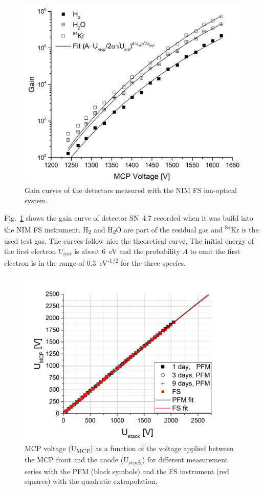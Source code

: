 	\begin{figure}[H] %
		\centering
		\includegraphics[width=.7\textwidth]{Experiments/GainDetFSLabEl.png}
		\caption{Gain curves of the detectors measured with the NIM FS ion-optical system.}
		\label{fig:MCPGainCurve4p7}
	\end{figure}
	Fig.~\ref{fig:MCPGainCurve4p7} shows the gain curve of detector SN~4.7 recorded when it was build into the NIM FS instrument. H\textsubscript{2} and H\textsubscript{2}O are part of the residual gas and \textsuperscript{84}Kr is the used test gas. The curves follow nice the theoretical curve. The initial energy of the first electron $U_{init}$ is about 6~eV and the probability $A$ to emit the first electron is in the range of 0.3~eV\textsuperscript{-1/2} for the three species.\\
	\begin{figure}[h!] %
		\centering
		\includegraphics[width=.8\textwidth]{Experiments/PFM_UstackUmccp_TimeEvol.png}
		\caption{MCP voltage (U\textsubscript{MCP}) as a function of the voltage applied between the MCP front and the anode (U\textsubscript{stack}) for different measurement series with the PFM (black symbols) and the FS instrument (red squares) with the quadratic extrapolation.}
		\label{fig:PFMUstackUmcpTimeEvol}
	\end{figure}
